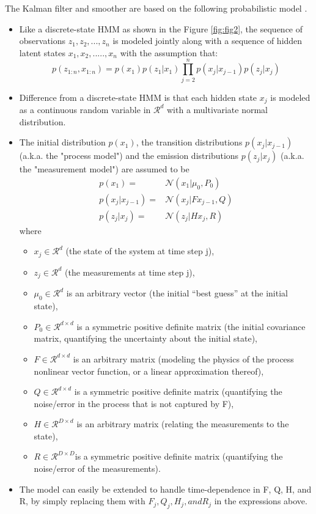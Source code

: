 \documentclass{article}
\begin{document}
The Kalman filter and smoother are based on the following probabilistic model \cite{JWMiller16}.
\begin{itemize}
\item Like a discrete-state HMM as shown in the Figure \ref{fig:fig2}, the sequence of observations $z_{1},z_{2}, . . . , z_{n}$ is modeled jointly along with a sequence of hidden latent states $x_{1}, x_{2}, ....., x_{n}$ with the assumption that:
\begin{equation}
p(z_{1:n}, x_{1:n}) = p(x_{1})p(z_{1}|x_{1}) \displaystyle\prod_{j=2}^{n} p(x_{j}|x_{j-1})p(z_{j}|x_{j}) 
\end{equation}  
\item Difference from a discrete-state HMM is that each hidden state $x_j$ is modeled as a continuous random variable in $\mathcal{R}^d$ with a multivariate normal distribution.
 
\item The initial distribution $p(x_{1})$, the transition distributions $p(x_{j} | x_{j-1})$ (a.k.a. the "process model") and the emission distributions $p(z_{j} | x_{j} )$ (a.k.a. the "measurement model") are assumed to be
\begin{equation}
\begin{split}
p(x_{1}) = &\mathcal{N} (x_{1} | \mu_{0}, P_{0}) \\
p(x_j | x_{j - 1}) = &\mathcal{N}  (x_{j}| F x_{j - 1}, Q) \\
p(z_j | x_j) = &\mathcal{N}  (z_j| Hx_j, R)
\end{split}
\end{equation}  
where
\begin{itemize}
    \item $x_{j} \in \mathcal{R}^{d} $ (the state of the system at time step j),
    \item $z_{j} \in \mathcal{R}^d$ (the measurements at time step j),
    \item $\mu_{0} \in \mathcal{R}^d$ is an arbitrary vector (the initial “best guess” at the initial state),
    \item $P_{0} \in \mathcal{R}^{d \times d}$ is a symmetric positive definite matrix (the initial covariance matrix, quantifying the uncertainty about the initial state),
    \item $F \in \mathcal{R}^{d \times d}$ is an arbitrary matrix (modeling the physics of the process nonlinear vector function, or a linear approximation thereof),
    \item $Q \in \mathcal{R}^{d \times d}$ is a symmetric positive definite matrix (quantifying the noise/error in the process that is not captured by F),
    \item $H \in \mathcal{R}^{D \times d}$ is an arbitrary matrix (relating the measurements to the state),
    \item $R \in \mathcal{R}^{D \times D}$is a symmetric positive definite matrix (quantifying the noise/error of the measurements).
\end{itemize}
\item The model can easily be extended to handle time-dependence in F, Q, H, and R, by simply replacing them with $F_{j}, Q_{j}, H_{j}, and R_{j}$ in the expressions above.  
\end{itemize}   
\end{document}
